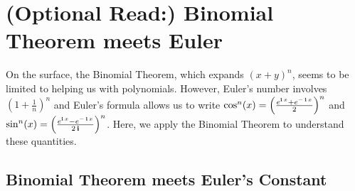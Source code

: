\begin{itemize}
\end{itemize}

\bigskip

\section{(Optional Read:) Binomial Theorem meets Euler}

On the surface, the Binomial Theorem, which expands $(x + y)^n$, seems to be limited to helping us with polynomials. However, Euler's number involves $\left(1 + \frac{1}{n} \right)^n$ and Euler's formula allows us to write $\cos^n(x) = \left( \frac{e^{\mathop{\bm{\mathrm i}} x} + e^{-\mathop{\bm{\mathrm i}} x}}{2}  \right)^n$ and  $\sin^n(x) = \left( \frac{e^{\mathop{\bm{\mathrm i}} x} - e^{-\mathop{\bm{\mathrm i}} x}}{2 \mathop{\bm{\mathrm i}}}  \right)^n$. Here, we apply the Binomial Theorem to understand these quantities. 

\subsection{Binomial Theorem meets Euler's Constant}
\label{sec:BinomialMeetsEuler}


